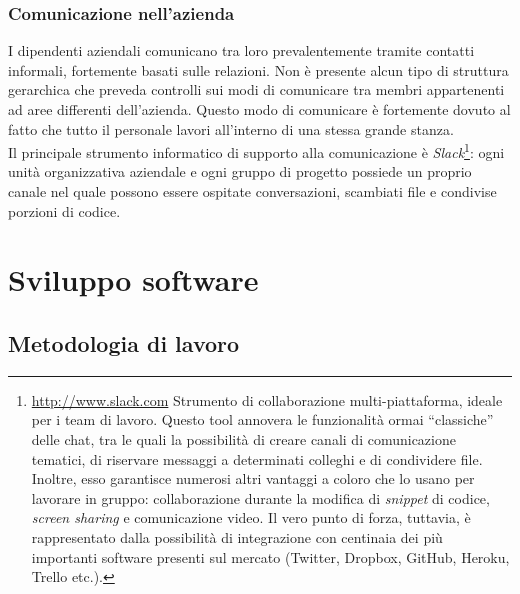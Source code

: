 			\subsubsection{Comunicazione nell'azienda}
				I dipendenti aziendali comunicano tra loro prevalentemente tramite contatti informali, fortemente basati sulle
				relazioni. Non è presente alcun tipo di struttura gerarchica che preveda controlli sui modi di comunicare tra membri
				appartenenti ad aree differenti dell'azienda. Questo modo di comunicare è fortemente dovuto al fatto che tutto il
				personale lavori all'interno di una stessa grande stanza.\\
				Il principale strumento informatico di supporto alla comunicazione è \emph{Slack}\footnote{\url{http://www.slack.com} Strumento di collaborazione multi-piattaforma, ideale per i team di lavoro. Questo tool annovera le funzionalità
ormai “classiche” delle chat, tra le quali la possibilità di creare canali di comunicazione tematici, di riservare messaggi a determinati colleghi e
di condividere file. Inoltre, esso garantisce numerosi altri vantaggi a coloro che lo usano per lavorare in gruppo: collaborazione durante la modifica
di \emph{snippet} di codice, \emph{screen sharing} e comunicazione video. Il vero punto di forza, tuttavia, è rappresentato dalla possibilità di
integrazione con centinaia dei più importanti software presenti sul mercato (Twitter, Dropbox, GitHub, Heroku, Trello etc.).}:
				ogni unità organizzativa aziendale e ogni gruppo di progetto possiede un proprio canale nel quale possono essere
				ospitate conversazioni, scambiati file e condivise porzioni di codice.
	\section{Sviluppo software}
		\subsection{Metodologia di lavoro}
